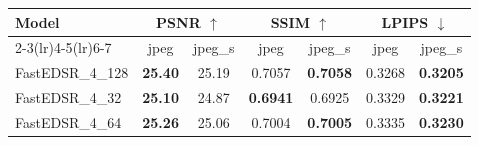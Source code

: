 \begin{tabular}{lcccccc}
\toprule
Model & \multicolumn{2}{c}{PSNR $\uparrow$} & \multicolumn{2}{c}{SSIM $\uparrow$} & \multicolumn{2}{c}{LPIPS $\downarrow$} \\
\cmidrule(lr){2-3}\cmidrule(lr){4-5}\cmidrule(lr){6-7}
 & jpeg & jpeg\_s & jpeg & jpeg\_s & jpeg & jpeg\_s \\
\midrule
FastEDSR\_4\_128 & \textbf{25.40} & 25.19 & 0.7057 & \textbf{0.7058} & 0.3268 & \textbf{0.3205} \\
FastEDSR\_4\_32 & \textbf{25.10} & 24.87 & \textbf{0.6941} & 0.6925 & 0.3329 & \textbf{0.3221} \\
FastEDSR\_4\_64 & \textbf{25.26} & 25.06 & 0.7004 & \textbf{0.7005} & 0.3335 & \textbf{0.3230} \\
\bottomrule
\end{tabular}